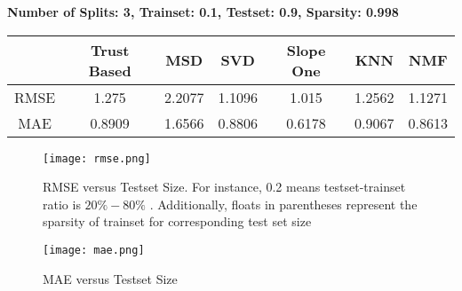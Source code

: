 	\vspace{1cm}
	\textbf{Number of Splits: 3, Trainset: 0.1, Testset: 0.9, Sparsity: 0.998}
	\begin{center}
		\begin{tabular}{ | c | c | c | c | c | c | c |}
			\hline
			& Trust Based & MSD & SVD & Slope One & KNN & NMF\\ 
			\hline
			RMSE& 1.275& 2.2077& 1.1096&1.015 & 1.2562& 1.1271\\
			\hline
			MAE& 0.8909 &1.6566 & 0.8806&0.6178 & 0.9067&0.8613\\
			\hline
		\end{tabular}
	\end{center} 

\begin{figure}[H]
	\centering
	\texttt{[image: rmse.png]}
	\caption{RMSE versus Testset Size. For instance, 0.2 means testset-trainset ratio is $20\%-80\%$ . Additionally, floats in parentheses represent the sparsity of trainset for corresponding test set size}
	\label{fig:rmse}
\end{figure}

\begin{figure}[H]
	\centering
	\texttt{[image: mae.png]}
	\caption{MAE versus Testset Size}
	\label{fig:mae}
\end{figure}